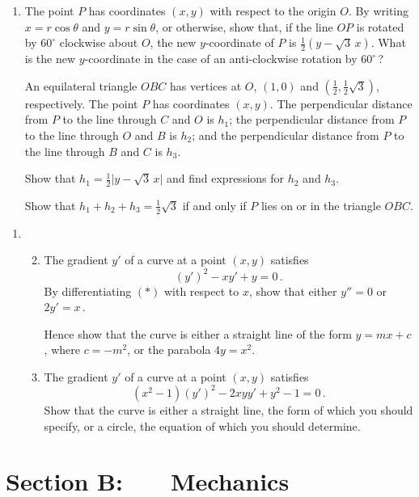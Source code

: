\documentclass[a4, 11pt]{report}
\newlength{\qspace}
\newcounter{qnumber}
\newenvironment{question}%
 {\vspace{\qspace}
  \begin{enumerate}[\bfseries 1\quad][10]%
    \setcounter{enumi}{\value{qnumber}}%
    \item%
 }
{
  \end{enumerate}
  \filbreak
  \stepcounter{qnumber}
 }
\newenvironment{questionparts}[1][1]%
 {
  \begin{enumerate}[\bfseries (i)]%
    \setcounter{enumii}{#1}
    \addtocounter{enumii}{-1}
    \setlength{\itemsep}{5mm}
    \setlength{\parskip}{8pt}
 }
 {
  \end{enumerate}
 }
\begin{document}
\begin{question}
The point $P$ has coordinates $(x,y)$ with respect to
the origin $O$. By writing $x=r\cos\theta$ and $y=r\sin\theta$,
or otherwise,  show that, if the line $OP$ is rotated by $60^\circ$
clockwise about $O$, the  new $y$-coordinate of $P$
is $\frac12(y-\sqrt3\,x)$.
What is the new $y$-coordinate in the case of an anti-clockwise
rotation by $60^\circ\,$?

An equilateral triangle $OBC$ has vertices at $O$, $(1,0)$ and 
$(\frac12,\frac12 \sqrt3)$, respectively. 
The point $P$ has coordinates
$(x,y)$. 
The perpendicular distance from $P$ to the line
through $C$ and $O$ is $h_1$;  
the perpendicular distance from $P$ to the line
through $O$ and $B$ is $h_2$; 
and the perpendicular distance from $P$ to the line through $B$ and $C$ is
$h_3$.

Show that 
$h_1=\frac12 \big\vert y-\sqrt3\,x\big\vert$ and find expressions
for $h_2$ and $h_3$.


Show that $h_1+h_2+h_3=\frac12 \sqrt3$ if and only if $P$ lies on or
in the triangle $OBC$.
\end{question}
		
\begin{question}	
\begin{questionparts}
\item
The gradient $y'$ of a curve at a point $(x,y)$ satisfies
\[
(y')^2 -xy'+y=0\,.
\tag{$*$}
\]
By differentiating $(*)$ with respect to $x$, show that either
$y''=0$ or $2y'=x\,$. 

Hence show that the curve is either a straight line of the form
$y=mx+c$, where $c=-m^2$, or the parabola $4y=x^2$.

\item
The gradient $y'$ of a curve at a point $(x,y)$ satisfies
\[
(x^2-1)(y')^2 -2xyy'+y^2-1=0\,.
\]
Show that the curve is either a straight line, the form
of which you should specify,
or a circle, the equation of which you should determine.


\end{questionparts}
\end{question}	
		

		
	
\newpage
\section*{Section B: \ \ \ Mechanics}
\end{document}
